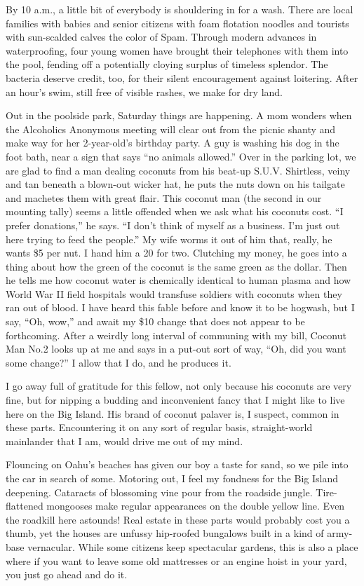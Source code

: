 By 10 a.m., a little bit of everybody is shouldering in for a wash.
There are local families with babies and senior citizens with foam
flotation noodles and tourists with sun-scalded calves the color of
Spam. Through modern advances in waterproofing, four young women have
brought their telephones with them into the pool, fending off a
potentially cloying surplus of timeless splendor. The bacteria deserve
credit, too, for their silent encouragement against loitering. After an
hour's swim, still free of visible rashes, we make for dry land.

Out in the poolside park, Saturday things are happening. A mom wonders
when the Alcoholics Anonymous meeting will clear out from the picnic
shanty and make way for her 2-year-old's birthday party. A guy is
washing his dog in the foot bath, near a sign that says ``no animals
allowed.'' Over in the parking lot, we are glad to find a man dealing
coconuts from his beat-up S.U.V. Shirtless, veiny and tan beneath a
blown-out wicker hat, he puts the nuts down on his tailgate and machetes
them with great flair. This coconut man (the second in our mounting
tally) seems a little offended when we ask what his coconuts cost. ``I
prefer donations,'' he says. ``I don't think of myself as a business.
I'm just out here trying to feed the people.'' My wife worms it out of
him that, really, he wants \$5 per nut. I hand him a 20 for two.
Clutching my money, he goes into a thing about how the green of the
coconut is the same green as the dollar. Then he tells me how coconut
water is chemically identical to human plasma and how World War II field
hospitals would transfuse soldiers with coconuts when they ran out of
blood. I have heard this fable before and know it to be hogwash, but I
say, ``Oh, wow,'' and await my \$10 change that does not appear to be
forthcoming. After a weirdly long interval of communing with my bill,
Coconut Man No.2 looks up at me and says in a put-out sort of way, ``Oh,
did you want some change?'' I allow that I do, and he produces it.

I go away full of gratitude for this fellow, not only because his
coconuts are very fine, but for nipping a budding and inconvenient fancy
that I might like to live here on the Big Island. His brand of coconut
palaver is, I suspect, common in these parts. Encountering it on any
sort of regular basis, straight-world mainlander that I am, would drive
me out of my mind.

Flouncing on Oahu's beaches has given our boy a taste for sand, so we
pile into the car in search of some. Motoring out, I feel my fondness
for the Big Island deepening. Cataracts of blossoming vine pour from the
roadside jungle. Tire-flattened mongooses make regular appearances on
the double yellow line. Even the roadkill here astounds! Real estate in
these parts would probably cost you a thumb, yet the houses are unfussy
hip-roofed bungalows built in a kind of army-base vernacular. While some
citizens keep spectacular gardens, this is also a place where if you
want to leave some old mattresses or an engine hoist in your yard, you
just go ahead and do it.

